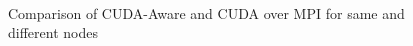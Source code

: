 \documentclass[10pt]{article}
\begin{document}
\begin{figure}[p]
\centering
        ~
      
    \caption{Comparison of CUDA-Aware and CUDA over MPI for same and different nodes}
   \label{cuda}
\end{figure}
\end{document}
